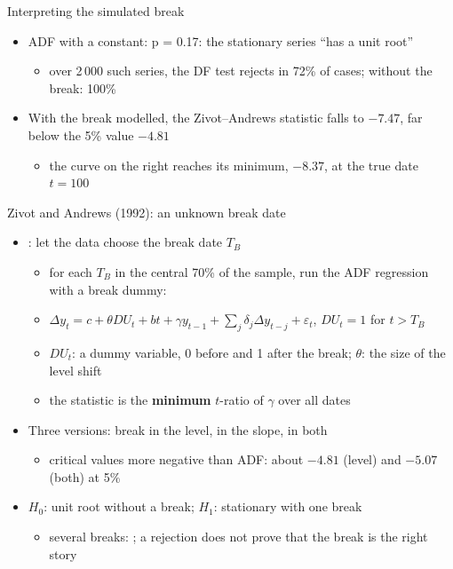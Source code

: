\begin{frame}{Interpreting the simulated break}
\itemsize{\small}
\begin{itemize}
    \item ADF with a constant: p = 0.17: the stationary series ``has a unit root''
    \begin{itemize}
        \item over 2\,000 such series, the DF test rejects in 72\% of cases; without the break: 100\%
    \end{itemize}
    \item With the break modelled, the Zivot--Andrews statistic falls to $\ensuremath{-}7.47$, far below the 5\% value $\ensuremath{-}4.81$
    \begin{itemize}
        \item the curve on the right reaches its minimum, $\ensuremath{-}8.37$, at the true date $t = 100$
    \end{itemize}
\end{itemize}
\end{frame}

\begin{frame}{Zivot and Andrews (1992): an unknown break date}
\itemsize{\small}
\begin{itemize}
    \item {}: let the data choose the break date $T_B$
    \begin{itemize}
        \item for each $T_B$ in the central 70\% of the sample, run the ADF regression with a break dummy:
        \item $\Delta y_t = c + \theta DU_t + bt + \gamma y_{t-1} + \sum_j\delta_j\Delta y_{t-j} + \varepsilon_t$, $DU_t = 1$ for $t > T_B$
        \item $DU_t$: a dummy variable, 0 before and 1 after the break; $\theta$: the size of the level shift
        \item the statistic is the \textbf{minimum} $t$-ratio of $\gamma$ over all dates
    \end{itemize}
    \item Three versions: break in the level, in the slope, in both
    \begin{itemize}
        \item critical values more negative than ADF: about $-4.81$ (level) and $-5.07$ (both) at 5\%
    \end{itemize}
    \item $H_0$: unit root without a break; $H_1$: stationary with one break
    \begin{itemize}
        \item several breaks: ; a rejection does not prove that the break is the right story
    \end{itemize}
\end{itemize}
\end{frame}

